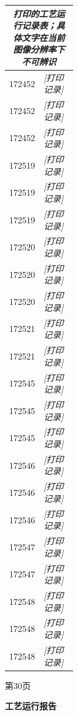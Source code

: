 \documentclass[UTF8,10pt,a4paper,fontset=fandol]{ctexart}
\begin{document}
\begin{center}
\begin{minipage}[t]{0.47\textwidth}
\small
\begin{tabularx}{\linewidth}{|p{0.22\linewidth}|X|}
\hline
\multicolumn{2}{|c|}{\textit{打印的工艺运行记录表；具体文字在当前图像分辨率下不可辨识}}\\
\hline
172452 & \textit{[打印记录]}\\ \hline
172452 & \textit{[打印记录]}\\ \hline
172452 & \textit{[打印记录]}\\ \hline
172519 & \textit{[打印记录]}\\ \hline
172519 & \textit{[打印记录]}\\ \hline
172519 & \textit{[打印记录]}\\ \hline
172520 & \textit{[打印记录]}\\ \hline
172520 & \textit{[打印记录]}\\ \hline
172520 & \textit{[打印记录]}\\ \hline
172521 & \textit{[打印记录]}\\ \hline
172521 & \textit{[打印记录]}\\ \hline
172545 & \textit{[打印记录]}\\ \hline
172545 & \textit{[打印记录]}\\ \hline
172545 & \textit{[打印记录]}\\ \hline
172546 & \textit{[打印记录]}\\ \hline
172546 & \textit{[打印记录]}\\ \hline
172546 & \textit{[打印记录]}\\ \hline
172547 & \textit{[打印记录]}\\ \hline
172547 & \textit{[打印记录]}\\ \hline
172548 & \textit{[打印记录]}\\ \hline
172548 & \textit{[打印记录]}\\ \hline
172548 & \textit{[打印记录]}\\ \hline
\end{tabularx}

\vspace{1mm}
第30页
\end{minipage}

\vspace{8mm}

\begin{minipage}[t]{0.47\textwidth}
\centering
\textbf{工艺运行报告}


\end{minipage}
\end{center}
\end{document}
